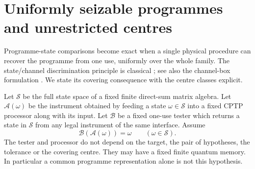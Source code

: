 \section{Uniformly seizable programmes and unrestricted centres}\label{sec:seizable72}
Programme-state comparisons become exact when a single physical
procedure can recover the programme from one use, uniformly over the
whole family. The state/channel discrimination principle is classical
\cite[Definition~36 and Theorem~37]{WBHK72}; see also the channel-box
formulation \cite[Section~III.A]{WW72}. We state its covering consequence
with the centre classes explicit.

Let $\mathcal S$ be the full state space of a fixed finite direct-sum
matrix algebra. Let $\mathcal A(\omega)$ be the instrument obtained
by feeding a state $\omega\in\mathcal S$ into a fixed CPTP processor
along with its input. Let $\mathcal B$ be a fixed one-use tester
which returns a state in $\mathcal S$ from any legal instrument of
the same interface. Assume
\begin{equation}\label{eq:uniformseizing72}
             \mathcal B(\mathcal A(\omega))=\omega
                         \qquad(\omega\in\mathcal S).
\end{equation}
The tester and processor do not depend on the target, the pair of
hypotheses, the tolerance or the covering centre. They may have a
fixed finite quantum memory. In particular a common programme
representation alone is not this hypothesis.

